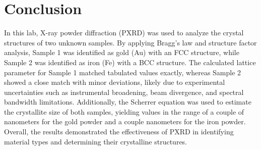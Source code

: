 \section{Conclusion}
In this lab, X-ray powder diffraction (PXRD) was used to analyze the crystal structures of two unknown samples. By applying Bragg’s law and structure factor analysis, Sample 1 was identified as gold (Au) with an FCC structure, while Sample 2 was identified as iron (Fe) with a BCC structure. The calculated lattice parameter for Sample 1 matched tabulated values exactly, whereas Sample 2 showed a close match with minor deviations, likely due to experimental uncertainties such as instrumental broadening, beam divergence, and spectral bandwidth limitations. Additionally, the Scherrer equation was used to estimate the crystallite size of both samples, yielding values in the range of a couple of nanometers for the gold powder and a couple nanometers for the iron powder. Overall, the results demonstrated the effectiveness of PXRD in identifying material types and determining their crystalline structures.

